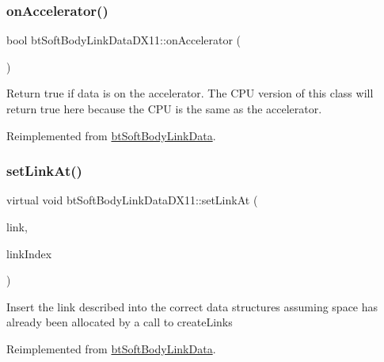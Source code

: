 \subsubsection{\texorpdfstring{on\+Accelerator()}{onAccelerator()}\hspace{0.1cm}{\footnotesize\ttfamily [2/2]}}
{\footnotesize\ttfamily bool bt\+Soft\+Body\+Link\+Data\+D\+X11\+::on\+Accelerator (\begin{DoxyParamCaption}{ }\end{DoxyParamCaption})\hspace{0.3cm}{\ttfamily [virtual]}}

Return true if data is on the accelerator. The C\+PU version of this class will return true here because the C\+PU is the same as the accelerator. 

Reimplemented from \hyperlink{classbtSoftBodyLinkData_ae284c2a182ddf82dde057a8c2eb17ac3}{bt\+Soft\+Body\+Link\+Data}.

\mbox{\label{classbtSoftBodyLinkDataDX11_a33aa1666f79ec3e6b065844a02930faf}} 
\subsubsection{\texorpdfstring{set\+Link\+At()}{setLinkAt()}\hspace{0.1cm}{\footnotesize\ttfamily [1/2]}}
{\footnotesize\ttfamily virtual void bt\+Soft\+Body\+Link\+Data\+D\+X11\+::set\+Link\+At (\begin{DoxyParamCaption}\item[{const \hyperlink{classbtSoftBodyLinkData_1_1LinkDescription}{Link\+Description} \&}]{link,  }\item[{int}]{link\+Index }\end{DoxyParamCaption})\hspace{0.3cm}{\ttfamily [virtual]}}

Insert the link described into the correct data structures assuming space has already been allocated by a call to create\+Links 

Reimplemented from \hyperlink{classbtSoftBodyLinkData_a44f200dcb878405cebf3704dc7a8b8cd}{bt\+Soft\+Body\+Link\+Data}.

\mbox{\label{classbtSoftBodyLinkDataDX11_a4ceea7a93543a6a54719e1d77c21cae1}} 
